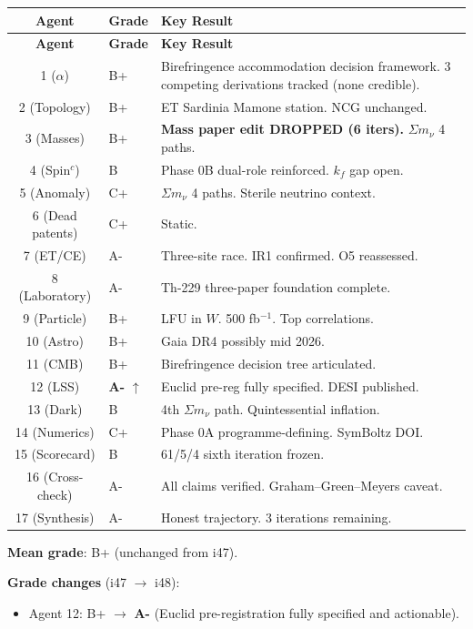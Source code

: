 \documentclass[11pt,a4paper]{article}
\begin{document}
\begin{center}
\begin{longtable}{clp{9cm}}
\toprule
\textbf{Agent} & \textbf{Grade} & \textbf{Key Result} \\
\midrule
\endfirsthead
\toprule
\textbf{Agent} & \textbf{Grade} & \textbf{Key Result} \\
\midrule
\endhead
1 ($\alpha$) & B+ & Birefringence accommodation decision framework. 3 competing derivations tracked (none credible). \\
2 (Topology) & B+ & ET Sardinia Mamone station. NCG unchanged. \\
3 (Masses) & B+ & \textbf{Mass paper edit DROPPED (6 iters).} $\Sigma m_\nu$ 4 paths. \\
4 (Spin$^c$) & B & Phase 0B dual-role reinforced. $k_f$ gap open. \\
5 (Anomaly) & C+ & $\Sigma m_\nu$ 4 paths. Sterile neutrino context. \\
6 (Dead patents) & C+ & Static. \\
7 (ET/CE) & A- & Three-site race. IR1 confirmed. O5 reassessed. \\
8 (Laboratory) & A- & Th-229 three-paper foundation complete. \\
9 (Particle) & B+ & LFU in $W$. 500 fb$^{-1}$. Top correlations. \\
10 (Astro) & B+ & Gaia DR4 possibly mid 2026. \\
11 (CMB) & B+ & Birefringence decision tree articulated. \\
12 (LSS) & \textbf{A-} $\uparrow$ & Euclid pre-reg fully specified. DESI published. \\
13 (Dark) & B & 4th $\Sigma m_\nu$ path. Quintessential inflation. \\
14 (Numerics) & C+ & Phase 0A programme-defining. SymBoltz DOI. \\
15 (Scorecard) & B & 61/5/4 sixth iteration frozen. \\
16 (Cross-check) & A- & All claims verified. Graham--Green--Meyers caveat. \\
17 (Synthesis) & A- & Honest trajectory. 3 iterations remaining. \\
\bottomrule
\end{longtable}
\end{center}

\textbf{Mean grade}: B+ (unchanged from i47).

\textbf{Grade changes} (i47 $\to$ i48):
\begin{itemize}
\item Agent 12: B+ $\to$ \textbf{A-} (Euclid pre-registration fully specified and actionable).
\end{itemize}
\end{document}
